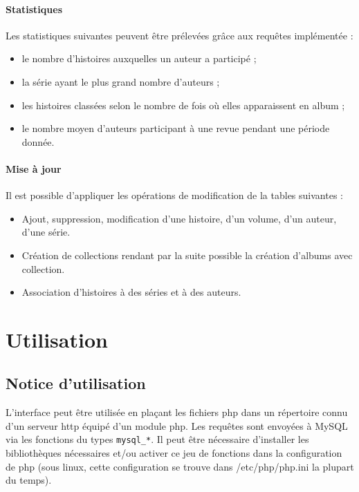 \documentclass[12pt]{article}
\begin{document}
\paragraph{Statistiques}
Les statistiques suivantes peuvent être prélevées grâce aux requêtes
implémentée :
\begin{itemize}
	\item le nombre d’histoires auxquelles un auteur a participé ;
	\item la série ayant le plus grand nombre d’auteurs ;
	\item les histoires classées selon le nombre de fois où elles apparaissent en album ;
	\item le nombre moyen d’auteurs participant à une revue pendant une période donnée.
\end{itemize}

\paragraph{Mise à jour}
Il est possible d'appliquer les opérations de modification de la tables
suivantes :
\begin{itemize}
	\item Ajout, suppression, modification d’une histoire, d’un volume, d’un
		auteur, d'une série.
	\item Création de collections rendant par la suite possible la création
		d'albums avec collection.
	\item Association d'histoires à des séries et à des auteurs.
\end{itemize}


\section{Utilisation}

\subsection{Notice d'utilisation}

L'interface peut être utilisée en plaçant les fichiers php dans un répertoire
connu d'un serveur http équipé d'un module php. Les requêtes sont envoyées à
MySQL via les fonctions du types \verb!mysql_*!. Il peut être nécessaire
d'installer les bibliothèques nécessaires et/ou activer ce jeu de fonctions
dans la configuration de php (sous linux, cette configuration se trouve dans
/etc/php/php.ini la plupart du temps).
\end{document}
